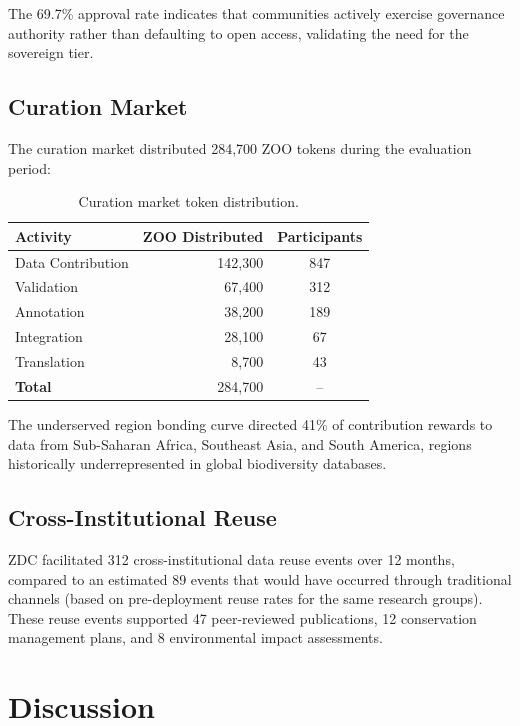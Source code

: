 \documentclass[11pt,a4paper]{article}
\begin{document}
The 69.7\% approval rate indicates that communities actively exercise governance authority rather than defaulting to open access, validating the need for the sovereign tier.

\subsection{Curation Market}

The curation market distributed 284,700 ZOO tokens during the evaluation period:

\begin{table}[H]
\centering
\caption{Curation market token distribution.}
\label{tab:market}
\begin{tabular}{@{}lrc@{}}
\toprule
\textbf{Activity} & \textbf{ZOO Distributed} & \textbf{Participants} \\
\midrule
Data Contribution & 142,300 & 847 \\
Validation & 67,400 & 312 \\
Annotation & 38,200 & 189 \\
Integration & 28,100 & 67 \\
Translation & 8,700 & 43 \\
\midrule
\textbf{Total} & 284,700 & -- \\
\bottomrule
\end{tabular}
\end{table}

The underserved region bonding curve directed 41\% of contribution rewards to data from Sub-Saharan Africa, Southeast Asia, and South America, regions historically underrepresented in global biodiversity databases.

\subsection{Cross-Institutional Reuse}

ZDC facilitated 312 cross-institutional data reuse events over 12 months, compared to an estimated 89 events that would have occurred through traditional channels (based on pre-deployment reuse rates for the same research groups).
These reuse events supported 47 peer-reviewed publications, 12 conservation management plans, and 8 environmental impact assessments.

\section{Discussion}
\label{sec:discussion}
\end{document}
